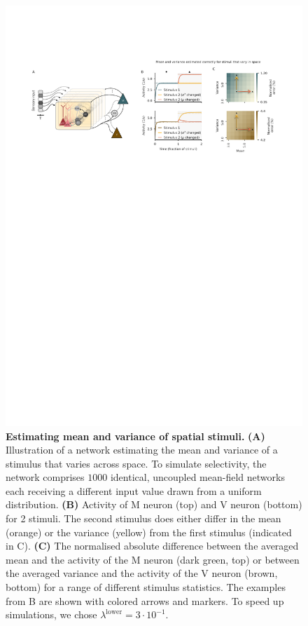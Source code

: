 \documentclass[10pt,a4paper]{article}
\begin{document}
\begin{figure}[!h]
	\centering
    \includegraphics[width=1\linewidth]{../results/figures/final/Fig_2_S3.pdf}%
\caption{\footnotesize{\bf Estimating mean and variance of spatial stimuli.\newline}  
{\bf (A)} Illustration of a network estimating the mean and variance of a stimulus that varies across space. To simulate selectivity, the network comprises $1000$ identical, uncoupled mean-field networks each receiving a different input value drawn from a uniform distribution. 
{\bf (B)} Activity of M neuron (top) and V neuron (bottom) for 2 stimuli. The second stimulus does either differ in the mean (orange) or the variance (yellow) from the first stimulus (indicated in C).
{\bf (C)} The normalised absolute difference between the averaged mean and the activity of the M neuron (dark green, top) or between the averaged variance and the activity of the V neuron (brown, bottom) for a range of different stimulus statistics. The examples from B are shown with colored arrows and markers. To speed up simulations, we chose $\lambda^\mathrm{lower}=3\cdot 10^{-1}$.
}
\label{fig:Fig_2_S3}
\end{figure}
\end{document}
